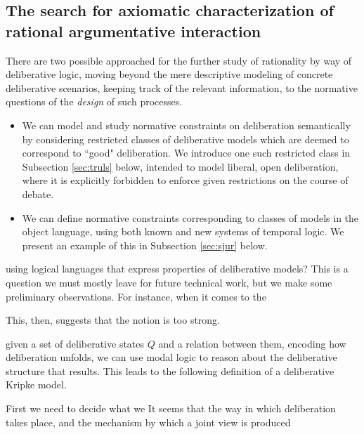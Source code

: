 \documentclass{article}
\begin{document}
\subsection{The search for axiomatic characterization of rational argumentative interaction}

 
There are two possible approached for the further study of rationality by way of deliberative logic, moving beyond the mere descriptive modeling of concrete deliberative scenarios, keeping track of the relevant information, to the normative questions of the \emph{design} of such processes.

\begin{itemize}
\item We can model and study normative constraints on deliberation semantically by considering restricted classes of deliberative models which are deemed to correspond to ``good" deliberation. We introduce one such restricted class in Subsection \ref{sec:truls} below, intended to model liberal, open deliberation, where it is explicitly forbidden to enforce given restrictions on the course of debate. 
\item We can define normative constraints corresponding to classes of models in the object language, using both known and new systems of temporal logic. We present an example of this in Subsection \ref{sec:sjur} below.
\end{itemize}



using logical languages that express properties of deliberative models? This is a question we must mostly leave for future technical work, but we make some preliminary observations. For instance, when it comes to the 

This, then, suggests that the notion is too strong. 


given a set of deliberative states $Q$ and a relation between them, encoding how deliberation unfolds, we can use modal logic to reason about the deliberative structure that results. This leads to the following definition of a deliberative Kripke model.



First we need to decide what we 
 It seems that the way in which deliberation takes place, and the mechanism by which a joint view is produced
\end{document}

